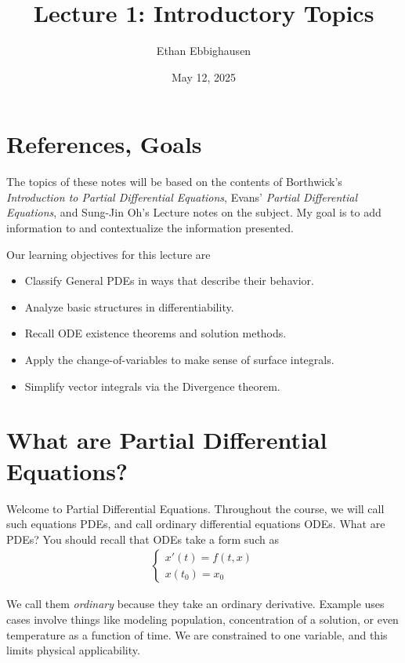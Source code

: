 \documentclass{article}
\title{Lecture 1: Introductory Topics}
\author{Ethan Ebbighausen}
\date{May 12, 2025}
\begin{document}
	\pagestyle{fancy}
	\fancyfoot{} 
	
	\maketitle
	\section{References, Goals}
	
	The topics of these notes will be based on the contents of Borthwick's \textit{Introduction to Partial Differential Equations}, Evans' \textit{Partial Differential Equations}, and Sung-Jin Oh's Lecture notes on the subject. My goal is to add information to and contextualize the information presented. 
	
	Our learning objectives for this lecture are 
	
	\begin{itemize}
		\item Classify General PDEs in ways that describe their behavior.
		\item Analyze basic structures in differentiability.
		\item Recall ODE existence theorems and solution methods.
		\item Apply the change-of-variables to make sense of surface integrals.
		\item Simplify vector integrals via the Divergence theorem.
	\end{itemize}
	
	\section{What are Partial Differential Equations?}
	
	Welcome to Partial Differential Equations. Throughout the course, we will call such equations PDEs, and call ordinary differential equations ODEs. What are PDEs? You should recall that ODEs take a form such as 
	\begin{align*}
		\begin{cases}
			x'(t) = f(t,x) \\
			x(t_0) = x_0
		\end{cases}
	\end{align*}
	
	We call them \textit{ordinary} because they take an ordinary derivative. Example uses cases involve things like modeling population, concentration of a solution, or even temperature as a function of time. We are constrained to one variable, and this limits physical applicability. 
	
\end{document}
